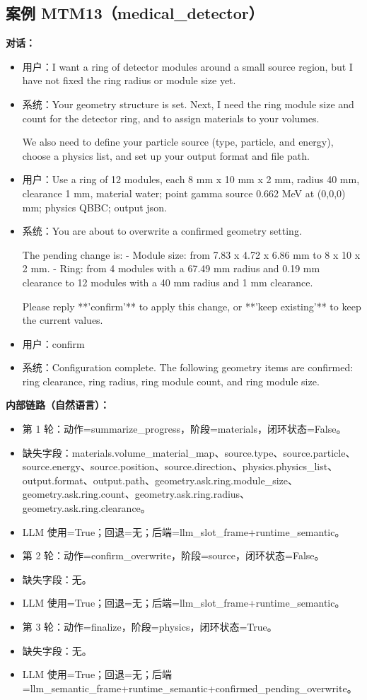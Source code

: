 \documentclass[11pt]{ctexart}
\begin{document}
\subsection{案例 MTM13（medical\_detector）}
\textbf{对话：}
\begin{itemize}
\item 用户：I want a ring of detector modules around a small source region, but I have not fixed the ring radius or module size yet.
\item 系统：Your geometry structure is set. Next, I need the ring module size and count for the detector ring, and to assign materials to your volumes.

We also need to define your particle source (type, particle, and energy), choose a physics list, and set up your output format and file path.
\item 用户：Use a ring of 12 modules, each 8 mm x 10 mm x 2 mm, radius 40 mm, clearance 1 mm, material water; point gamma source 0.662 MeV at (0,0,0) mm; physics QBBC; output json.
\item 系统：You are about to overwrite a confirmed geometry setting.

The pending change is:
- Module size: from 7.83 x 4.72 x 6.86 mm to 8 x 10 x 2 mm.
- Ring: from 4 modules with a 67.49 mm radius and 0.19 mm clearance to 12 modules with a 40 mm radius and 1 mm clearance.

Please reply **'confirm'** to apply this change, or **'keep existing'** to keep the current values.
\item 用户：confirm
\item 系统：Configuration complete. The following geometry items are confirmed: ring clearance, ring radius, ring module count, and ring module size.
\end{itemize}
\textbf{内部链路（自然语言）：}
\begin{itemize}
\item 第 1 轮：动作=summarize\_progress，阶段=materials，闭环状态=False。
\item 缺失字段：materials.volume\_material\_map、source.type、source.particle、source.energy、source.position、source.direction、physics.physics\_list、output.format、output.path、geometry.ask.ring.module\_size、geometry.ask.ring.count、geometry.ask.ring.radius、geometry.ask.ring.clearance。
\item LLM 使用=True；回退=无；后端=llm\_slot\_frame+runtime\_semantic。
\item 第 2 轮：动作=confirm\_overwrite，阶段=source，闭环状态=False。
\item 缺失字段：无。
\item LLM 使用=True；回退=无；后端=llm\_slot\_frame+runtime\_semantic。
\item 第 3 轮：动作=finalize，阶段=physics，闭环状态=True。
\item 缺失字段：无。
\item LLM 使用=True；回退=无；后端=llm\_semantic\_frame+runtime\_semantic+confirmed\_pending\_overwrite。
\end{itemize}
\end{document}
